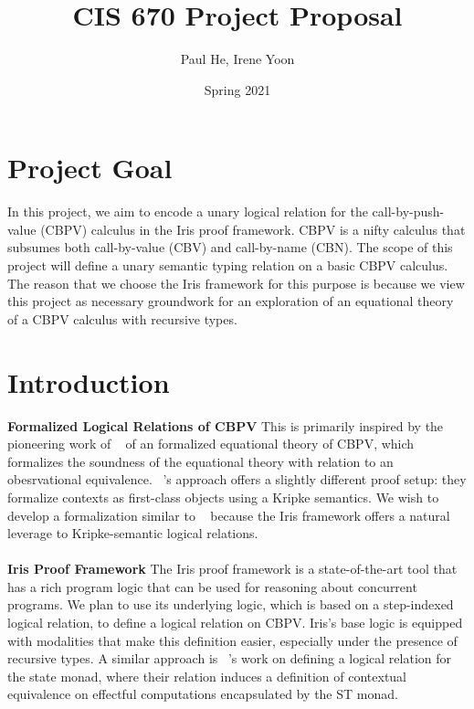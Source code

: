 \documentclass[11pt,twoside]{article}
\begin{document}
\title{CIS 670 Project Proposal}
\author{Paul He, Irene Yoon}
\date{Spring 2021}

\maketitle{}


\section{Project Goal}
In this project, we aim to encode a unary logical relation for the call-by-push-
value (CBPV) calculus in the Iris proof framework. CBPV is a nifty calculus that
subsumes both call-by-value (CBV) and call-by-name (CBN). The scope of this project
will define a unary semantic typing relation on a basic CBPV calculus. The reason
that we choose the Iris framework for this purpose is because we view this project
as necessary groundwork for an exploration of an equational theory of a CBPV
calculus with recursive types. 

\section{Introduction} 

\textbf{Formalized Logical Relations of CBPV}
This is primarily inspired by the pioneering work of 
~\cite{rizkallah} of an formalized equational theory of CBPV, which formalizes the
soundness of the equational theory with relation to an obesrvational equivalence.
~\cite{forster}'s approach offers a slightly different proof setup: they formalize 
contexts as first-class objects using a Kripke semantics.
We wish to develop a formalization similar to ~\cite{forster} because the Iris
framework offers a natural leverage to Kripke-semantic logical relations.\\
\\
\textbf{Iris Proof Framework}
The Iris proof framework is a state-of-the-art tool that has a rich program logic 
that can be used for reasoning about concurrent programs. 
We plan to use its underlying logic, which is based on a 
step-indexed logical relation, to define a logical relation on CBPV.
Iris's base logic is equipped with modalities that make this definition easier,
especially under the presence of recursive types.
A similar approach is ~\cite{timany}'s work on defining a logical relation for 
the state monad, where their relation induces a definition of contextual 
equivalence on effectful computations encapsulated by the ST monad.
\end{document}
